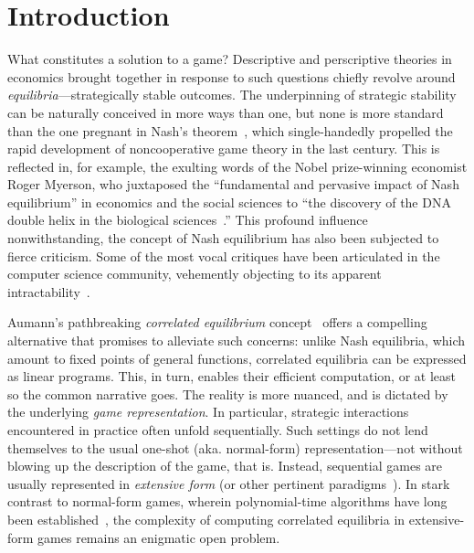 \section{Introduction}

What constitutes a solution to a game? Descriptive and perscriptive theories in economics brought together in response to such questions chiefly revolve around \emph{equilibria}---strategically stable outcomes. The underpinning of strategic stability can be naturally conceived in more ways than one, but none is more standard than the one pregnant in Nash's theorem~\citep{Nash51:Non}, which single-handedly propelled the rapid development of noncooperative game theory in the last century. This is reflected in, for example, the exulting words of the Nobel prize-winning economist Roger Myerson, who juxtaposed the ``fundamental and pervasive impact of Nash equilibrium'' in economics and the social sciences to ``the discovery of the DNA double helix in the biological sciences~\citep{Myerson99:Nash}.'' This profound influence nonwithstanding, the concept of Nash equilibrium has also been subjected to fierce criticism. Some of the most vocal critiques have been articulated in the computer science community, vehemently objecting to its apparent intractability~\citep{Daskalakis08:Complexity,Chen09:Settling,Rubinstein16:Settling,Rubinstein15:Inapproximability,Etessami07:Complexity}.

Aumann's pathbreaking \emph{correlated equilibrium} concept~\citep{Aumann74:Subjectivity} offers a compelling alternative that promises to alleviate such concerns: unlike Nash equilibria, which amount to fixed points of general functions, correlated equilibria can be expressed as linear programs. This, in turn, enables their efficient computation, or at least so the common narrative goes. The reality is more nuanced, and is dictated by the underlying \emph{game representation}. In particular, strategic interactions encountered in practice often unfold sequentially. Such settings do not lend themselves to the usual one-shot (aka. normal-form) representation---not without blowing up the description of the game, that is. Instead, sequential games are usually represented in \emph{extensive form} (or other pertinent paradigms~\citep{Littman94:Markov}). In stark contrast to normal-form games, wherein polynomial-time algorithms have long been established~\citep{Papadimitriou08:Computing,Jiang11:Polynomial}, the complexity of computing correlated equilibria in extensive-form games remains an enigmatic open problem.

